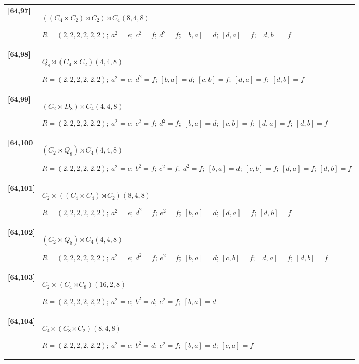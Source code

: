 \documentclass[UTF8,fontset=fandol,11pt,a4paper]{ctexart}
\begin{document}
\begin{longtable}{@{}p{17mm}>{\raggedright\arraybackslash}p{141mm}@{}}
\textbf{[64,97]} & $((C_{4}\times C_{2})\rtimes C_{2})\rtimes C_{4}$\quad $(8,4,8)$\par\(R=(2,2,2,2,2,2);\allowbreak\ a^{2}=e;\allowbreak\ c^{2}=f;\allowbreak\ d^{2}=f;\allowbreak\ [b,a]=d;\allowbreak\ [d,a]=f;\allowbreak\ [d,b]=f\)\\[3pt]

\textbf{[64,98]} & $Q_{8}\rtimes (C_{4}\times C_{2})$\quad $(4,4,8)$\par\(R=(2,2,2,2,2,2);\allowbreak\ a^{2}=e;\allowbreak\ d^{2}=f;\allowbreak\ [b,a]=d;\allowbreak\ [c,b]=f;\allowbreak\ [d,a]=f;\allowbreak\ [d,b]=f\)\\[3pt]

\textbf{[64,99]} & $(C_{2}\times D_{8})\rtimes C_{4}$\quad $(4,4,8)$\par\(R=(2,2,2,2,2,2);\allowbreak\ a^{2}=e;\allowbreak\ c^{2}=f;\allowbreak\ d^{2}=f;\allowbreak\ [b,a]=d;\allowbreak\ [c,b]=f;\allowbreak\ [d,a]=f;\allowbreak\ [d,b]=f\)\\[3pt]

\textbf{[64,100]} & $(C_{2}\times Q_{8})\rtimes C_{4}$\quad $(4,4,8)$\par\(R=(2,2,2,2,2,2);\allowbreak\ a^{2}=e;\allowbreak\ b^{2}=f;\allowbreak\ c^{2}=f;\allowbreak\ d^{2}=f;\allowbreak\ [b,a]=d;\allowbreak\ [c,b]=f;\allowbreak\ [d,a]=f;\allowbreak\ [d,b]=f\)\\[3pt]

\textbf{[64,101]} & $C_{2}\times ((C_{4}\times C_{4})\rtimes C_{2})$\quad $(8,4,8)$\par\(R=(2,2,2,2,2,2);\allowbreak\ a^{2}=e;\allowbreak\ d^{2}=f;\allowbreak\ e^{2}=f;\allowbreak\ [b,a]=d;\allowbreak\ [d,a]=f;\allowbreak\ [d,b]=f\)\\[3pt]

\textbf{[64,102]} & $(C_{2}\times Q_{8})\rtimes C_{4}$\quad $(4,4,8)$\par\(R=(2,2,2,2,2,2);\allowbreak\ a^{2}=e;\allowbreak\ d^{2}=f;\allowbreak\ e^{2}=f;\allowbreak\ [b,a]=d;\allowbreak\ [c,b]=f;\allowbreak\ [d,a]=f;\allowbreak\ [d,b]=f\)\\[3pt]

\textbf{[64,103]} & $C_{2}\times (C_{4}\rtimes C_{8})$\quad $(16,2,8)$\par\(R=(2,2,2,2,2,2);\allowbreak\ a^{2}=e;\allowbreak\ b^{2}=d;\allowbreak\ e^{2}=f;\allowbreak\ [b,a]=d\)\\[3pt]

\textbf{[64,104]} & $C_{4}\rtimes (C_{8}\rtimes C_{2})$\quad $(8,4,8)$\par\(R=(2,2,2,2,2,2);\allowbreak\ a^{2}=e;\allowbreak\ b^{2}=d;\allowbreak\ e^{2}=f;\allowbreak\ [b,a]=d;\allowbreak\ [c,a]=f\)\\[3pt]


\end{longtable}
\end{document}
